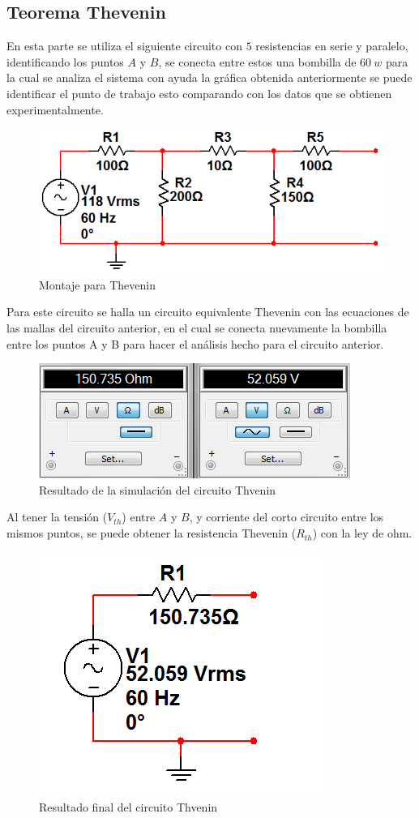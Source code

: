 \documentclass[twocolumn]{IEEEtran}
\begin{document}
\subsection{Teorema Thevenin}
\noindent
En esta parte se utiliza el siguiente circuito con $5$ resistencias en serie y paralelo, identificando los puntos $A$ y $B$,  se conecta entre estos una bombilla de $60 \ w$ para la cual se analiza el sistema  con ayuda la gráfica obtenida anteriormente se puede identificar el punto de trabajo esto comparando con los datos que se obtienen experimentalmente.
\begin{figure}[H]
	\centering
		\includegraphics[scale=0.5]{m3.png}
	\caption{Montaje para Thevenin}
	\label{fig5}
\end{figure}
\noindent
Para este circuito se halla un circuito equivalente Thevenin con las ecuaciones de las mallas del circuito anterior, en el cual se conecta nuevamente la bombilla entre los puntos A y B para hacer el análisis hecho para el circuito anterior.
\begin{figure}[H]
	\centering
		\includegraphics[scale=0.5]{r1.png}
	\caption{Resultado de la simulación del circuito Thvenin}
	\label{fig6}
\end{figure}
\noindent
Al tener la tensión ($V_{th}$) entre $A$ y $B$, y corriente del corto circuito entre los mismos puntos, se puede obtener la resistencia Thevenin ($R_{th}$) con la ley de ohm.
\begin{figure}[H]
	\centering
		\includegraphics[scale=0.5]{th3.png}
	\caption{Resultado final del circuito Thvenin}
	\label{fig7}
\end{figure}
\end{document}
